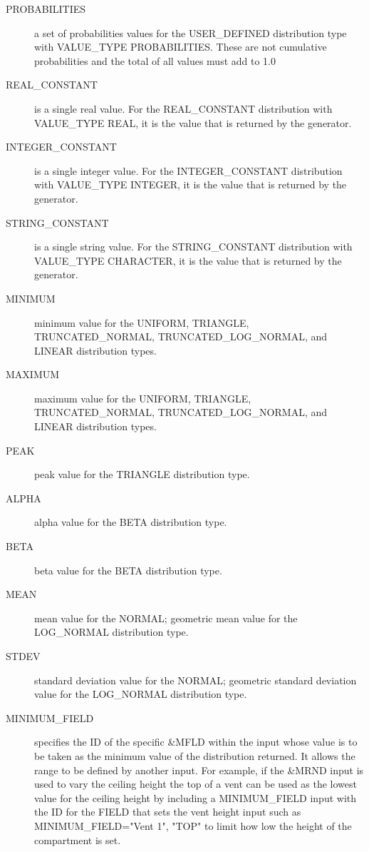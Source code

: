 \documentclass[12pt,twoside]{book}
\begin{document}
\begin{description}
  \item[PROBABILITIES] a set of probabilities values for the {\ct USER\_DEFINED} distribution type with {\ct VALUE\_TYPE} {\ct PROBABILITIES}. These are not cumulative probabilities and the total of all values must add to 1.0
  \item[REAL\_CONSTANT] is a single real value. For the {\ct REAL\_CONSTANT} distribution with {\ct VALUE\_TYPE} {\ct REAL}, it is the value that is returned by the generator.
  \item[INTEGER\_CONSTANT] is a single integer value. For the {\ct INTEGER\_CONSTANT} distribution with {\ct VALUE\_TYPE} {\ct INTEGER}, it is the value that is returned by the generator.
  \item[STRING\_CONSTANT] is a single string value. For the {\ct STRING\_CONSTANT} distribution with {\ct VALUE\_TYPE} {\ct CHARACTER}, it is the value that is returned by the generator.
  \item[MINIMUM] minimum value for the {\ct UNIFORM}, {\ct TRIANGLE}, {\ct TRUNCATED\_NORMAL}, {\ct TRUNCATED\_LOG\_NORMAL}, and {\ct LINEAR} distribution types.
  \item[MAXIMUM] maximum value for the {\ct UNIFORM}, {\ct TRIANGLE}, {\ct TRUNCATED\_NORMAL}, {\ct TRUNCATED\_LOG\_NORMAL}, and {\ct LINEAR} distribution types.
  \item[PEAK] peak value for the {\ct TRIANGLE} distribution type.
  \item[ALPHA] alpha value for the {\ct BETA} distribution type.
  \item[BETA] beta value for the {\ct BETA} distribution type.
  \item[MEAN] mean value for the {\ct NORMAL}; geometric mean value for the {\ct LOG\_NORMAL} distribution type.
  \item[STDEV] standard deviation value for the {\ct NORMAL}; geometric standard deviation value for the {\ct LOG\_NORMAL} distribution type.
  \item[MINIMUM\_FIELD] specifies the ID of the specific \&MFLD within the input whose value is to be taken as the minimum value of the distribution returned. It allows the range to be defined by another input. For example, if the {\ct \&MRND} input is used to vary the ceiling height the top of a vent can be used as the lowest value for the ceiling height by including a {\ct MINIMUM\_FIELD} input with the {\ct ID} for the {\ct FIELD} that sets the vent height input such as {\ct MINIMUM\_FIELD="Vent 1", "TOP"} to limit how low the height of the compartment is set.

\end{description}
\end{document}
